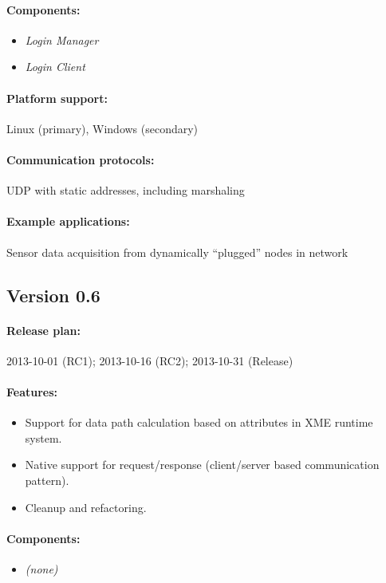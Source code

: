 \paragraph{Components:}
\begin{itemize}
	\item \emph{Login Manager}
	\item \emph{Login Client}
\end{itemize}

\paragraph{Platform support:} Linux (primary), Windows (secondary)
\paragraph{Communication protocols:} UDP with static addresses, including marshaling
\paragraph{Example applications:} Sensor data acquisition from dynamically ``plugged'' nodes in network



\subsection{Version 0.6}

\paragraph{Release plan:} 2013-10-01 (RC1); 2013-10-16 (RC2); 2013-10-31 (Release)

\paragraph{Features:}
\begin{itemize}
	\item Support for data path calculation based on attributes in XME runtime system.
	\item Native support for request/response (client/server based communication pattern).
	\item Cleanup and refactoring.
\end{itemize}

\paragraph{Components:}
\begin{itemize}
	\item \textit{(none)}
\end{itemize}

